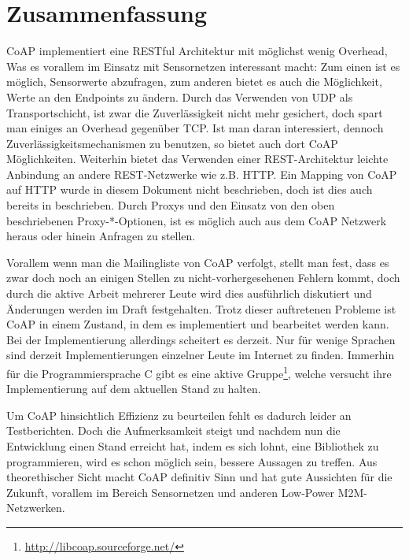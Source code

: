 \section{Zusammenfassung}
\ac{CoAP} implementiert eine \ac{REST}ful Architektur mit möglichst wenig Overhead,
Was es vorallem im Einsatz mit Sensornetzen interessant macht: Zum einen ist es
möglich, Sensorwerte abzufragen, zum anderen bietet es auch die Möglichkeit, Werte
an den Endpoints zu ändern. Durch das Verwenden von \ac{UDP} als Transportschicht,
ist zwar die Zuverlässigkeit nicht mehr gesichert, doch spart man einiges an
Overhead gegenüber \ac{TCP}. Ist man daran interessiert, dennoch
Zuverlässigkeitsmechanismen zu benutzen, so bietet auch dort \ac{CoAP}
Möglichkeiten. Weiterhin bietet das Verwenden einer \ac{REST}-Architektur leichte
Anbindung an andere \ac{REST}-Netzwerke wie z.B. \ac{HTTP}. Ein Mapping von \ac{CoAP}
auf \ac{HTTP} wurde in diesem Dokument nicht beschrieben, doch ist dies auch bereits
in \cite{draft-ietf-core-coap-13} beschrieben. Durch Proxys und den Einsatz von den
oben beschriebenen Proxy-*-Optionen, ist es möglich auch aus dem \ac{CoAP} Netzwerk
heraus oder hinein Anfragen zu stellen.

Vorallem wenn man die Mailingliste von \ac{CoAP} verfolgt, stellt man fest, dass
es zwar doch noch an einigen Stellen zu nicht-vorhergesehenen Fehlern kommt, doch
durch die aktive Arbeit mehrerer Leute wird dies ausführlich diskutiert und
Änderungen werden im Draft festgehalten. Trotz dieser auftretenen Probleme ist
\ac{CoAP} in einem Zustand, in dem es implementiert und bearbeitet werden kann.
Bei der Implementierung allerdings scheitert es derzeit. Nur für wenige Sprachen
sind derzeit Implementierungen einzelner Leute im Internet zu finden. Immerhin
für die Programmiersprache C gibt es eine aktive
Gruppe\footnote{\url{http://libcoap.sourceforge.net/}}, welche versucht ihre
Implementierung auf dem aktuellen Stand zu halten.

Um \ac{CoAP} hinsichtlich Effizienz zu beurteilen fehlt es dadurch leider an
Testberichten. Doch die Aufmerksamkeit steigt und nachdem nun die Entwicklung
einen Stand erreicht hat, indem es sich lohnt, eine Bibliothek zu programmieren,
wird es schon möglich sein, bessere Aussagen zu treffen. Aus theorethischer Sicht
macht CoAP definitiv Sinn und hat gute Aussichten für die Zukunft, vorallem im
Bereich Sensornetzen und anderen Low-Power \ac{M2M}-Netzwerken.

 